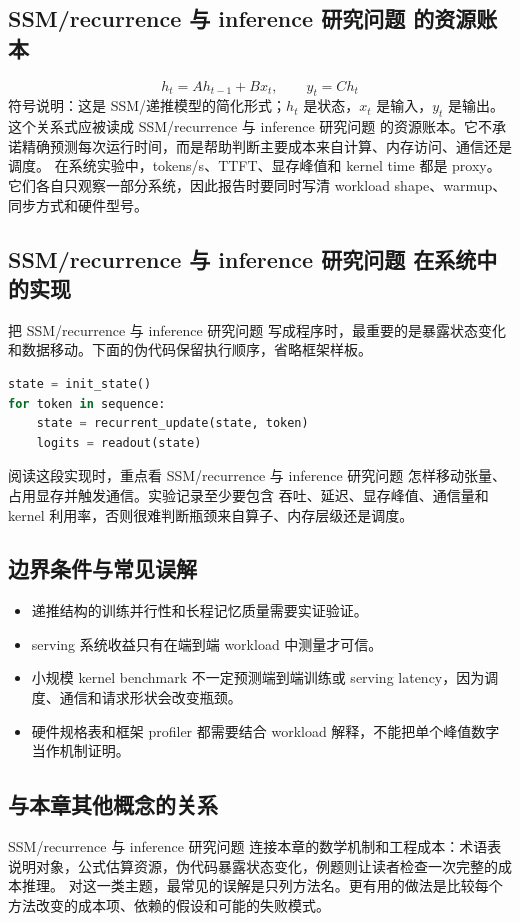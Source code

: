 \documentclass[a4paper]{article}
\begin{document}
\subsection{SSM/recurrence 与 inference 研究问题 的资源账本}
\[h_t=A h_{t-1}+B x_t,\qquad y_t=C h_t\]
符号说明：这是 SSM/递推模型的简化形式；\(h_t\) 是状态，\(x_t\) 是输入，\(y_t\) 是输出。
这个关系式应被读成 SSM/recurrence 与 inference 研究问题 的资源账本。它不承诺精确预测每次运行时间，而是帮助判断主要成本来自计算、内存访问、通信还是调度。
在系统实验中，tokens/s、TTFT、显存峰值和 kernel time 都是 proxy。它们各自只观察一部分系统，因此报告时要同时写清 workload shape、warmup、同步方式和硬件型号。
\subsection{SSM/recurrence 与 inference 研究问题 在系统中的实现}
把 SSM/recurrence 与 inference 研究问题 写成程序时，最重要的是暴露状态变化和数据移动。下面的伪代码保留执行顺序，省略框架样板。
\begin{lstlisting}[language=Python]
state = init_state()
for token in sequence:
    state = recurrent_update(state, token)
    logits = readout(state)
\end{lstlisting}
阅读这段实现时，重点看 SSM/recurrence 与 inference 研究问题 怎样移动张量、占用显存并触发通信。实验记录至少要包含 吞吐、延迟、显存峰值、通信量和 kernel 利用率，否则很难判断瓶颈来自算子、内存层级还是调度。
\subsection{边界条件与常见误解}
\begin{itemize}
\item 递推结构的训练并行性和长程记忆质量需要实证验证。
\item serving 系统收益只有在端到端 workload 中测量才可信。
\item 小规模 kernel benchmark 不一定预测端到端训练或 serving latency，因为调度、通信和请求形状会改变瓶颈。
\item 硬件规格表和框架 profiler 都需要结合 workload 解释，不能把单个峰值数字当作机制证明。
\end{itemize}
\subsection{与本章其他概念的关系}
SSM/recurrence 与 inference 研究问题 连接本章的数学机制和工程成本：术语表说明对象，公式估算资源，伪代码暴露状态变化，例题则让读者检查一次完整的成本推理。
对这一类主题，最常见的误解是只列方法名。更有用的做法是比较每个方法改变的成本项、依赖的假设和可能的失败模式。
\end{document}
